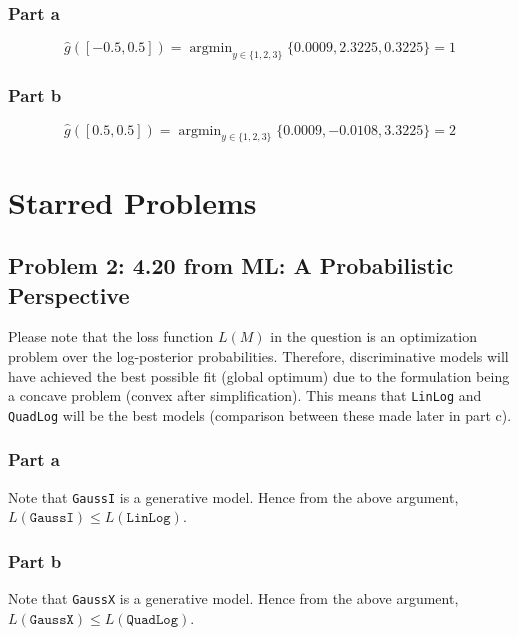 \documentclass{article}
\newcommand{\argmin}{\mathop{\mathrm{argmin}}}
\begin{document}
\begin{flushleft}
\subsubsection*{Part a}
\begin{equation}
\hat{g}([-0.5, 0.5]) = \argmin_{y \in \{1, 2, 3\}} \{0.0009, 2.3225, 0.3225\} = 1
\end{equation}

\subsubsection*{Part b}
\begin{equation}
\hat{g}([0.5, 0.5]) = \argmin_{y \in \{1, 2, 3\}} \{0.0009, -0.0108, 3.3225\} = 2
\end{equation}
\end{flushleft}

\section*{Starred Problems}
\subsection*{Problem 2: 4.20 from ML: A Probabilistic Perspective}
Please note that the loss function \(L(M)\) in the question is an optimization problem over the log-posterior probabilities. Therefore, discriminative models will have achieved the best possible fit (global optimum) due to the formulation being a concave problem (convex after simplification). This means that \texttt{LinLog} and \texttt{QuadLog} will be the best models (comparison between these made later in part c).
\subsubsection*{Part a}
\begin{flushleft}
Note that \texttt{GaussI} is a generative model. Hence from the above argument, \(L(\texttt{GaussI}) \leq L(\texttt{LinLog})\).
\end{flushleft}

\subsubsection*{Part b}
\begin{flushleft}
Note that \texttt{GaussX} is a generative model. Hence from the above argument, \(L(\texttt{GaussX}) \leq L(\texttt{QuadLog})\).
\end{flushleft}
\end{document}
